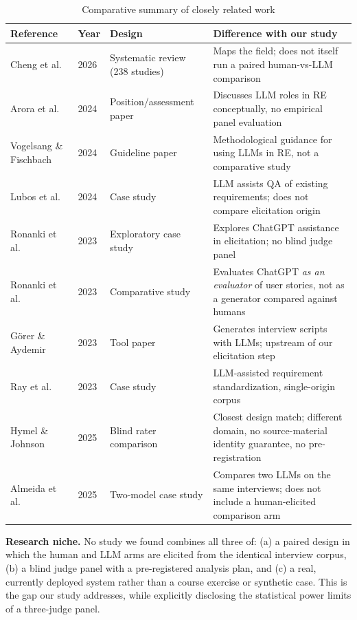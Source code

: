 \documentclass{llncs}
\begin{document}
\begin{table}[htbp]
\centering
\caption{Comparative summary of closely related work}
\label{tab:relwork}
\small
\begin{tabular}{p{2.3cm}p{0.6cm}p{2.3cm}p{4.5cm}}
\toprule
Reference & Year & Design & Difference with our study \\
\midrule
Cheng et al.~\cite{cheng2026genai} & 2026 & Systematic review (238 studies) & Maps the field; does not itself run a paired human-vs-LLM comparison \\
Arora et al.~\cite{arora2024advancing} & 2024 & Position/assessment paper & Discusses LLM roles in RE conceptually, no empirical panel evaluation \\
Vogelsang \& Fischbach~\cite{vogelsang2024using} & 2024 & Guideline paper & Methodological guidance for using LLMs in RE, not a comparative study \\
Lubos et al.~\cite{lubos2024leveraging} & 2024 & Case study & LLM assists QA of existing requirements; does not compare elicitation origin \\
Ronanki et al.~\cite{ronanki2023investigating} & 2023 & Exploratory case study & Explores ChatGPT assistance in elicitation; no blind judge panel \\
Ronanki et al.~\cite{ronanki2023chatgpt} & 2023 & Comparative study & Evaluates ChatGPT \emph{as an evaluator} of user stories, not as a generator compared against humans \\
G\"orer \& Aydemir~\cite{gorer2023generating} & 2023 & Tool paper & Generates interview scripts with LLMs; upstream of our elicitation step \\
Ray et al.~\cite{ray2023agile} & 2023 & Case study & LLM-assisted requirement standardization, single-origin corpus \\
Hymel \& Johnson~\cite{hymel2025analysis} & 2025 & Blind rater comparison & Closest design match; different domain, no source-material identity guarantee, no pre-registration \\
Almeida et al.~\cite{almeida2025elicitation} & 2025 & Two-model case study & Compares two LLMs on the same interviews; does not include a human-elicited comparison arm \\
\bottomrule
\end{tabular}
\end{table}

\textbf{Research niche.} No study we found combines all three of: (a) a paired design in
which the human and LLM arms are elicited from the identical interview corpus, (b) a
blind judge panel with a pre-registered analysis plan, and (c) a real, currently
deployed system rather than a course exercise or synthetic case. This is the gap our
study addresses, while explicitly disclosing the statistical power limits of a
three-judge panel.
\end{document}
